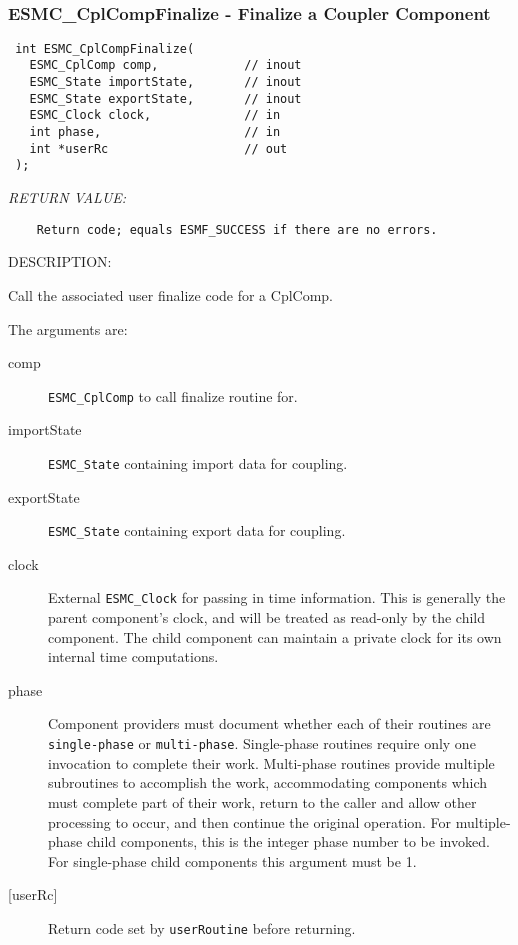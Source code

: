  
\mbox{}\hrulefill\ 
 
\subsubsection [ESMC\_CplCompFinalize] {ESMC\_CplCompFinalize - Finalize a Coupler Component}


  
\begin{verbatim} int ESMC_CplCompFinalize(
   ESMC_CplComp comp,            // inout
   ESMC_State importState,       // inout
   ESMC_State exportState,       // inout 
   ESMC_Clock clock,             // in
   int phase,                    // in
   int *userRc                   // out
 );\end{verbatim}{\em RETURN VALUE:}
\begin{verbatim}    Return code; equals ESMF_SUCCESS if there are no errors.\end{verbatim}
{\sf DESCRIPTION:\\ }


  
    Call the associated user finalize code for a CplComp.
  
    The arguments are:
    \begin{description}
    \item[comp]
      {\tt ESMC\_CplComp} to call finalize routine for.
    \item[importState]
      {\tt ESMC\_State} containing import data for coupling.
    \item[exportState]
      {\tt ESMC\_State} containing export data for coupling.
    \item[clock]
      External {\tt ESMC\_Clock} for passing in time information. This is 
      generally the parent component's clock, and will be treated as read-only
      by the child component. The child component can maintain a private clock
      for its own internal time computations.
    \item[phase]
      Component providers must document whether each of their routines are 
      {\tt single-phase} or {\tt multi-phase}. Single-phase routines require 
      only one invocation to complete their work. Multi-phase routines provide
      multiple subroutines to accomplish the work, accommodating components
      which must complete part of their work, return to the caller and allow 
      other processing to occur, and then continue the original operation. 
      For multiple-phase child components, this is the integer phase number to
      be invoked. For single-phase child components this argument must be 1.
    \item[{[userRc]}]
      Return code set by {\tt userRoutine} before returning.
    \end{description}
   

